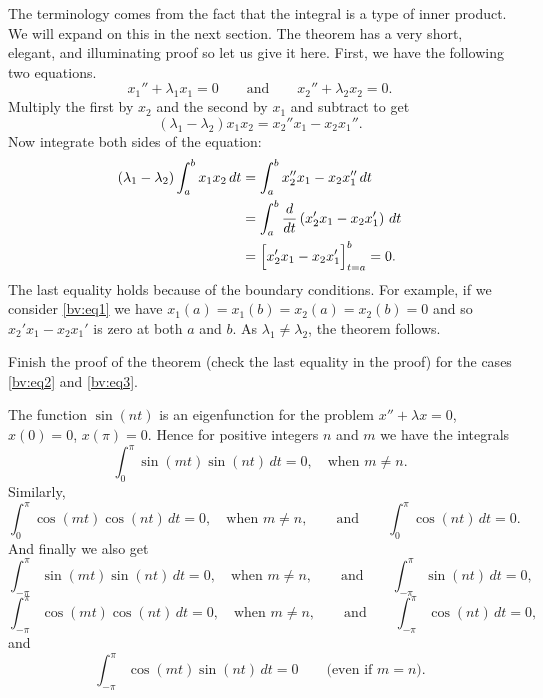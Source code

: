 The terminology comes from the fact that the integral is a type of
inner product.  We will expand on this in the next section.  The theorem
has a very short, elegant, and illuminating proof so let us give it here.
First, we have the following two equations.
\begin{equation*}
x_1'' + \lambda_1 x_1 = 0
\qquad \text{and} \qquad
x_2'' + \lambda_2 x_2 = 0.
\end{equation*}
Multiply the first by $x_2$ and the second by $x_1$ and subtract to get
\begin{equation*}
(\lambda_1 - \lambda_2) x_1 x_2 = x_2'' x_1 - x_2 x_1'' .
\end{equation*}
Now integrate both sides of the equation:
\begin{equation*}
\begin{split}
(\lambda_1 - \lambda_2) \int_a^b x_1 x_2 \,dt
& =
\int_a^b x_2'' x_1 - x_2 x_1'' \,dt \\
& =
\int_a^b \frac{d}{dt} \left( x_2' x_1 - x_2 x_1' \right) \,dt \\
& =
\Bigl[ x_2' x_1 - x_2 x_1' \Bigr]_{t=a}^b
= 0 .
\end{split}
\end{equation*}
The last equality holds because of the boundary conditions.  For example, if
we consider \eqref{bv:eq1} we have $x_1(a) = x_1(b) = x_2(a) = x_2(b) = 0$
and so $x_2' x_1 - x_2 x_1'$ is zero at both $a$ and $b$.
As $\lambda_1 \not= \lambda_2$, the theorem follows.

\begin{exercise}[easy]
Finish the proof of the theorem (check the last equality in the proof) for the cases
\eqref{bv:eq2} and \eqref{bv:eq3}.
\end{exercise}

The function $\sin (n t)$ is an eigenfunction for the problem
$x''+\lambda x = 0$, $x(0) = 0$, $x(\pi) = 0$. 
Hence for positive
integers $n$ and $m$ we have the integrals
\begin{equation*}
\int_{0}^\pi \sin (mt) \sin (nt) \,dt = 0 ,
\quad
\text{when } m \not = n.
\end{equation*}
Similarly,
\begin{equation*}
\int_{0}^\pi \cos (mt) \cos (nt) \,dt = 0 ,
\quad
\text{when } m \not = n,
\qquad \text{and} \qquad
\int_{0}^\pi  \cos (nt) \,dt = 0 .
\end{equation*}
And finally we also get
\begin{equation*}
\int_{-\pi}^\pi \sin (mt) \sin (nt) \,dt = 0 ,
\quad
\text{when } m \not = n, 
\qquad \text{and} \qquad
\int_{-\pi}^\pi  \sin (nt) \,dt = 0 ,
\end{equation*}
\begin{equation*}
\int_{-\pi}^\pi \cos (mt) \cos (nt) \,dt = 0 ,
\quad
\text{when } m \not = n,
\qquad \text{and} \qquad
\int_{-\pi}^\pi  \cos (nt) \,dt = 0 ,
\end{equation*}
and
\begin{equation*}
\int_{-\pi}^\pi \cos (mt) \sin (nt) \,dt = 0 
\qquad \text{(even if $m=n$).}
\end{equation*}

